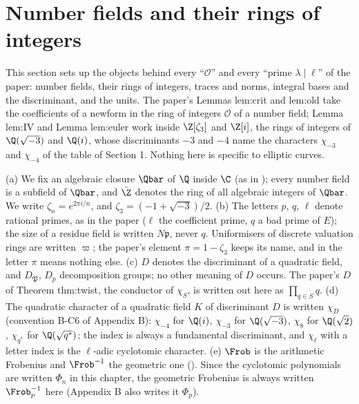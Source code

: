 \section{Number fields and their rings of integers}\label{sec:ant:integers}

This section sets up the objects behind every ``$\mathcal O$'' and every ``prime $\lambda\mid\ell$'' of the paper: number fields, their rings of
integers, traces and norms, integral bases and the discriminant, and the units. The paper's Lemmas lem:crit and lem:old take the
coefficients of a newform in the ring of integers $\mathcal O$ of a number field; Lemma lem:IV and Lemma lem:euler work inside
$\Z[\zeta_3]$ and $\Z[i]$, the rings of integers of $\Q(\sqrt{-3})$ and $\Q(i)$, whose discriminants $-3$ and $-4$ name the characters $\chi_{-3}$ and
$\chi_{-4}$ of the table of Section 1. Nothing here is specific to elliptic curves.

\begin{convention}\label{conv:ant:conventions}
(a) We fix an algebraic closure $\Qbar$ of $\Q$ inside $\C$ (as in ); every number field is a subfield of $\Qbar$, and $\bar\Z$
denotes the ring of all algebraic integers of $\Qbar$. We write $\zeta_n=e^{2\pi i/n}$, and $\zeta_3=(-1+\sqrt{-3})/2$.
(b) The letters $p$, $q$, $\ell$ denote rational primes, as in the paper ($\ell$ the coefficient prime, $q$ a bad prime of $E$); the size of a
residue field is written $N\mathfrak p$, never $q$. Uniformisers of discrete valuation rings are written $\varpi$; the paper's element
$\pi=1-\zeta_3$ keeps its name, and in  the letter $\pi$ means nothing else.
(c) $D$ denotes the discriminant of a quadratic field, and $D_{\mathfrak P}$, $D_p$ decomposition groups; no other meaning of $D$ occurs. The paper's $D$
of Theorem thm:twist, the conductor of $\chi_S$, is written out here as $\prod_{q\in S}q$.
(d) The quadratic character of a quadratic field $K$ of discriminant $D$ is written $\chi_D$ (convention B-C6 of
Appendix B): $\chi_{-4}$ for $\Q(i)$, $\chi_{-3}$ for $\Q(\sqrt{-3})$, $\chi_8$ for $\Q(\sqrt2)$, $\chi_{q^*}$ for $\Q(\sqrt{q^*})$; the index is
always a fundamental discriminant, and $\chi_\ell$ with a letter index is the $\ell$-adic cyclotomic character.
(e) $\Frob$ is the arithmetic Frobenius and $\Frob^{-1}$ the geometric one (). Since the cyclotomic polynomials are
written $\Phi_n$ in this chapter, the geometric Frobenius is always written $\Frob_p^{-1}$ here (Appendix B also writes it $\Phi_p$).
\end{convention}

